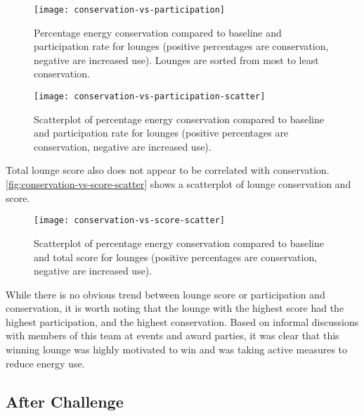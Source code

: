 \begin{figure}[htbp]
	\centering
	\texttt{[image: conservation-vs-participation]}
	\caption[Percentage energy conservation and participation rate for lounges]{Percentage energy conservation compared to baseline and participation rate for lounges (positive percentages are conservation, negative are increased use). Lounges are sorted from most to least conservation.}
	\label{fig:conservation-vs-participation}
\end{figure}

\begin{figure}[htbp]
	\centering
	\texttt{[image: conservation-vs-participation-scatter]}
	\caption[Scatterplot of percentage energy conservation and participation rate for lounges]{Scatterplot of percentage energy conservation compared to baseline and participation rate for lounges (positive percentages are conservation, negative are increased use).}
	\label{fig:conservation-vs-participation-scatter}
\end{figure}

Total lounge score also does not appear to be correlated with conservation. \autoref{fig:conservation-vs-score-scatter} shows a scatterplot of lounge conservation and score.

\begin{figure}[htbp]
	\centering
	\texttt{[image: conservation-vs-score-scatter]}
	\caption[Scatterplot of percentage energy conservation and score for lounges]{Scatterplot of percentage energy conservation compared to baseline and total score for lounges (positive percentages are conservation, negative are increased use).}
	\label{fig:conservation-vs-score-scatter}
\end{figure}

While there is no obvious trend between lounge score or participation and conservation, it is worth noting that the lounge with the highest score had the highest participation, and the highest conservation. Based on informal discussions with members of this team at events and award parties, it was clear that this winning lounge was highly motivated to win and was taking active measures to reduce energy use.


\subsection{After Challenge}

